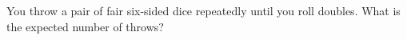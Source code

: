 You throw a pair of fair six-sided dice repeatedly until you roll doubles. What is the expected number of throws?

